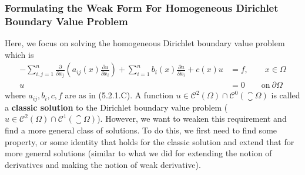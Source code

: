 \subsubsection{Formulating the Weak Form For Homogeneous Dirichlet Boundary Value Problem }
Here, we focus on solving the homogeneous Dirichlet boundary value problem which is
\begin{align*}
	-\sum_{i,j=1}^{n}\frac{\partial}{\partial x_j}(a_{ij}(x) \frac{\partial u}{\partial x_i}) + \sum_{i=1}^{n}b_i(x) \frac{\partial u}{\partial x_i} + c(x) u &= f, \qquad x \in \Omega \\
	u &= 0 \qquad \text{on}\ \partial \Omega \tag{5.2.$\clubsuit$}
\end{align*}
where $ a_{ij}, b_i, c, f $ are as in (5.2.1.C). A function $ u \in \mathscr{C}^2(\Omega) \cap \mathscr{C}^0(\closure{\Omega}) $ is called a \textbf{classic solution} to the Dirichlet boundary value problem ($ u \in \mathscr{C}^2(\Omega)\cap \mathscr{C}^1(\closure{\Omega}) $). However, we want to weaken this requirement and find a more general class of solutions. To do this, we first need to find some property, or some identity that holds for the classic solution and extend that for more general solutions (similar to what we did for extending the notion of derivatives and making the notion of weak derivative). 

